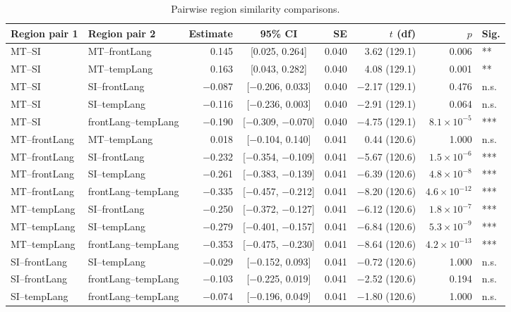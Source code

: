 \begin{table}[h]
\centering
\begin{tabular}{llrcrrrl}
\toprule
Region pair 1 & Region pair 2 & Estimate & 95\% CI & SE & $t$ (df) & $p$ & Sig. \\
\midrule
MT--SI & MT--frontLang & 0.145 & [0.025, 0.264] & 0.040 & 3.62 (129.1) & 0.006 & ** \\
MT--SI & MT--tempLang & 0.163 & [0.043, 0.282] & 0.040 & 4.08 (129.1) & 0.001 & ** \\
MT--SI & SI--frontLang & $-$0.087 & [$-$0.206, 0.033] & 0.040 & $-$2.17 (129.1) & 0.476 & n.s. \\
MT--SI & SI--tempLang & $-$0.116 & [$-$0.236, 0.003] & 0.040 & $-$2.91 (129.1) & 0.064 & n.s. \\
MT--SI & frontLang--tempLang & $-$0.190 & [$-$0.309, $-$0.070] & 0.040 & $-$4.75 (129.1) & $8.1\times10^{-5}$ & *** \\
MT--frontLang & MT--tempLang & 0.018 & [$-$0.104, 0.140] & 0.041 & 0.44 (120.6) & 1.000 & n.s. \\
MT--frontLang & SI--frontLang & $-$0.232 & [$-$0.354, $-$0.109] & 0.041 & $-$5.67 (120.6) & $1.5\times10^{-6}$ & *** \\
MT--frontLang & SI--tempLang & $-$0.261 & [$-$0.383, $-$0.139] & 0.041 & $-$6.39 (120.6) & $4.8\times10^{-8}$ & *** \\
MT--frontLang & frontLang--tempLang & $-$0.335 & [$-$0.457, $-$0.212] & 0.041 & $-$8.20 (120.6) & $4.6\times10^{-12}$ & *** \\
MT--tempLang & SI--frontLang & $-$0.250 & [$-$0.372, $-$0.127] & 0.041 & $-$6.12 (120.6) & $1.8\times10^{-7}$ & *** \\
MT--tempLang & SI--tempLang & $-$0.279 & [$-$0.401, $-$0.157] & 0.041 & $-$6.84 (120.6) & $5.3\times10^{-9}$ & *** \\
MT--tempLang & frontLang--tempLang & $-$0.353 & [$-$0.475, $-$0.230] & 0.041 & $-$8.64 (120.6) & $4.2\times10^{-13}$ & *** \\
SI--frontLang & SI--tempLang & $-$0.029 & [$-$0.152, 0.093] & 0.041 & $-$0.72 (120.6) & 1.000 & n.s. \\
SI--frontLang & frontLang--tempLang & $-$0.103 & [$-$0.225, 0.019] & 0.041 & $-$2.52 (120.6) & 0.194 & n.s. \\
SI--tempLang & frontLang--tempLang & $-$0.074 & [$-$0.196, 0.049] & 0.041 & $-$1.80 (120.6) & 1.000 & n.s. \\
\bottomrule
\end{tabular}
\caption{Pairwise region similarity comparisons.}
\end{table}
